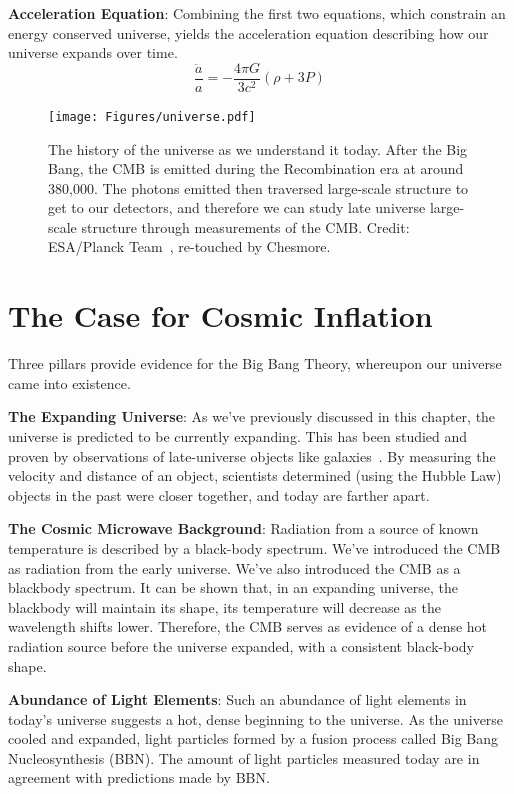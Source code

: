 \noindent
\textbf{Acceleration Equation}: Combining the first two equations, which constrain an energy conserved universe, yields the acceleration equation describing how our universe expands over time.  
\begin{equation}
    \frac{\ddot{a}}{a} = - \frac{4\pi G}{3 c^2} (\rho + 3 P)
\end{equation}
\begin{figure}
    \centering
    \texttt{[image: Figures/universe.pdf]}
    \caption{The history of the universe as we understand it today.  After the Big Bang, the CMB is emitted during the Recombination era at around 380,000.  The photons emitted then traversed large-scale structure to get to our detectors, and therefore we can study late universe large-scale structure through measurements of the CMB.  Credit: ESA/Planck Team~\cite{NASApic}, re-touched by Chesmore.}
    \label{fig:universe_timeline}
\end{figure}
\section{The Case for Cosmic Inflation}
Three pillars provide evidence for the Big Bang Theory, whereupon our universe came into existence.

\noindent
\textbf{The Expanding Universe}: As we've previously discussed in this chapter, the universe is predicted to be currently expanding.  This has been studied and proven by observations of late-universe objects like galaxies~\cite{1999ApJ...517..565P}.  By measuring the velocity and distance of an object, scientists determined (using the Hubble Law) objects in the past were closer together, and today are farther apart.  

\noindent
\textbf{The Cosmic Microwave Background}:
Radiation from a source of known temperature is described by a black-body spectrum.  We've introduced the CMB as radiation from the early universe.  We've also introduced the CMB as a blackbody spectrum.  It can be shown that, in an expanding universe, the blackbody will maintain its shape, its temperature will decrease as the wavelength shifts lower.  Therefore, the CMB serves as evidence of a dense hot radiation source before the universe expanded, with a consistent black-body shape.

\noindent
\textbf{Abundance of Light Elements}:  Such an abundance of light elements in today's universe suggests a hot, dense beginning to the universe.  As the universe cooled and expanded, light particles formed by a fusion process called Big Bang Nucleosynthesis (BBN).  The amount of light particles measured today are in agreement with predictions made by BBN.


